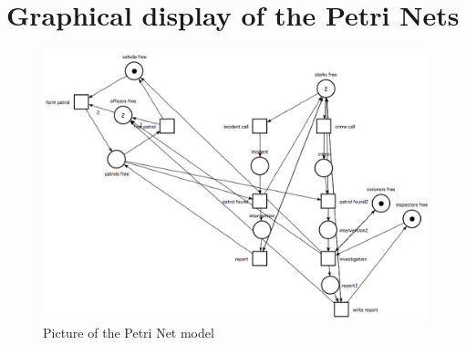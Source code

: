 \section{Graphical display of the Petri Nets}
\label{sec:Graphical display of the Petri Nets}
\begin{figure}[!h]
  \centering
    \includegraphics[width=\textwidth]{model.png}
    \caption{Picture of the Petri Net model}
\end{figure}
